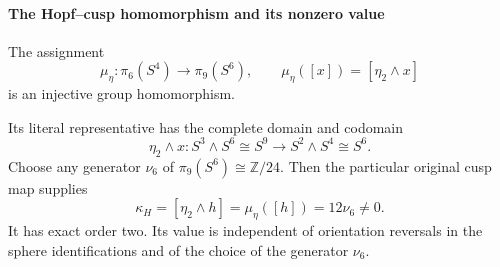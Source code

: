 \paragraph{The Hopf--cusp homomorphism and its nonzero value}

\begin{theorem}
\label{h24:hbridge:mu-theorem}
The assignment
\begin{equation}
\mu_\eta:\pi_6(S^4)\longrightarrow\pi_9(S^6),\qquad
\mu_\eta([x])=[\eta_2\wedge x]
\label{h24:hbridge:eq:mu}
\end{equation}
is an injective group homomorphism.\par
Its literal representative has
the complete domain and codomain
\[
\eta_2\wedge x:S^3\wedge S^6\cong S^9
\longrightarrow S^2\wedge S^4\cong S^6.
\]
Choose any generator \(\nu_6\) of
\(\pi_9(S^6)\cong\mathbb Z/24\). Then the particular original
cusp map supplies
\begin{equation}
\kappa_H=[\eta_2\wedge h]
=\mu_\eta([h])=12\nu_6\ne0.
\label{h24:hbridge:eq:kappa}
\end{equation}
It has exact order two. Its value is independent of orientation
reversals in the sphere identifications and of the choice of the
generator \(\nu_6\).
\end{theorem}

